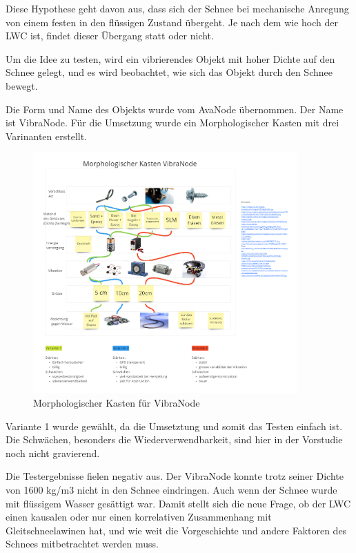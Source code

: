 
Diese Hypothese geht davon aus, dass sich der Schnee bei mechanische Anregung von einem festen in den flüssigen Zustand übergeht. Je nach dem wie hoch der LWC ist, findet dieser Übergang statt oder nicht.

Um die Idee zu testen, wird ein vibrierendes Objekt mit hoher Dichte auf den Schnee gelegt, und es wird beobachtet, wie sich das Objekt durch den Schnee bewegt.

Die Form und Name des Objekts wurde vom AvaNode übernommen. Der Name  ist VibraNode. Für die Umsetzung wurde ein Morphologischer Kasten mit drei Varinanten erstellt.


\begin{figure}[H]
    \centering
    \includegraphics[width=0.9\textwidth]{Bilder/Unbenann2t.PNG}
    \caption{Morphologischer Kasten für VibraNode}
    \label{fig:Bildverarbeitnugskonzpet}
\end{figure}


Variante 1 wurde gewählt, da die Umsetztung und somit das Testen einfach ist. Die Schwächen, besonders die Wiederverwendbarkeit, sind hier in der Vorstudie noch nicht gravierend.

Die Testergebnisse fielen negativ aus. Der VibraNode konnte trotz seiner Dichte von 1600 kg/m3 nicht in den Schnee eindringen. Auch wenn der Schnee wurde mit flüssigem Wasser gesättigt war. Damit  stellt sich die neue Frage, ob der LWC einen kausalen oder nur einen korrelativen Zusammenhang mit Gleitschneelawinen hat, und wie weit die Vorgeschichte und andere Faktoren des Schnees mitbetrachtet werden muss. \cite{Altman.2015}
